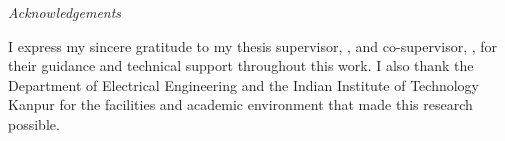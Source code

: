\thispagestyle{plain}
\begin{center}
  {\huge\itshape Acknowledgements\par}
\end{center}
\vspace{1.5em}

I express my sincere gratitude to my thesis supervisor,
\ThesisSupervisor, and co-supervisor, \ThesisCoSupervisor, for their guidance
and technical support throughout this work. I also thank the Department of
Electrical Engineering and the Indian Institute of Technology Kanpur for the
facilities and academic environment that made this research possible.

\vfill
\begin{flushleft}
\textbf{\ThesisAuthor}
\end{flushleft}
